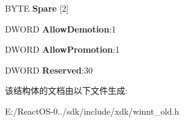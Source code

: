 \begin{DoxyCompactItemize}
B\+Y\+TE {\bfseries Spare} \mbox{[}2\mbox{]}
\item 
\mbox{\label{struct___p_r_o_c_e_s_s_o_r___p_o_w_e_r___p_o_l_i_c_y___i_n_f_o_a8780556059730f5a275fae7ce25a0bde}} 
D\+W\+O\+RD {\bfseries Allow\+Demotion}\+:1
\item 
\mbox{\label{struct___p_r_o_c_e_s_s_o_r___p_o_w_e_r___p_o_l_i_c_y___i_n_f_o_a46abf2f751f01187f23ad4b92f55c272}} 
D\+W\+O\+RD {\bfseries Allow\+Promotion}\+:1
\item 
\mbox{\label{struct___p_r_o_c_e_s_s_o_r___p_o_w_e_r___p_o_l_i_c_y___i_n_f_o_a758ebd57b77e4606df08edc012c7bd67}} 
D\+W\+O\+RD {\bfseries Reserved}\+:30
\end{DoxyCompactItemize}


该结构体的文档由以下文件生成\+:\begin{DoxyCompactItemize}
\item 
E\+:/\+React\+O\+S-\/0../sdk/include/xdk/winnt\+\_\+old.\+h\end{DoxyCompactItemize}
